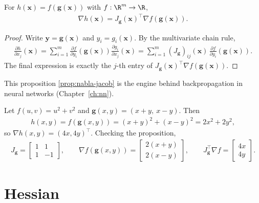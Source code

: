 \documentclass[a4paper, 12pt]{book}
\begin{document}
\begin{proposition}\label{prop:nabla-jacob}
    For $h(\mathbf{x}) = f(\mathbf{g}(\mathbf{x}))$ with $f : \R^m \to \R$,
\begin{align}
    \nabla h(\mathbf{x}) = J_{\mathbf{g}}(\mathbf{x})^\top \nabla f(\mathbf{g}(\mathbf{x})).
\end{align}
\end{proposition}
\begin{proof}
    Write $\mathbf{y}=\mathbf{g}(\mathbf{x})$ and $y_i=g_i(\mathbf{x})$. By the
    multivariate chain rule,
    \begin{align}
        \frac{\partial h}{\partial x_j}(\mathbf{x})
        = \sum_{i=1}^m
          \frac{\partial f}{\partial y_i}(\mathbf{g}(\mathbf{x}))
          \frac{\partial g_i}{\partial x_j}(\mathbf{x})
        = \sum_{i=1}^m
          (J_{\mathbf{g}})_{ij}(\mathbf{x})\,
          \frac{\partial f}{\partial y_i}(\mathbf{g}(\mathbf{x})).
    \end{align}
    The final expression is exactly the $j$-th entry of
    $J_{\mathbf{g}}(\mathbf{x})^\top\nabla f(\mathbf{g}(\mathbf{x}))$.
\end{proof}
This proposition \ref{prop:nabla-jacob} is the engine behind backpropagation in neural networks
(Chapter~\ref{ch:nn}).
\begin{example}
    Let $f(u,v)=u^2+v^2$ and $\mathbf{g}(x,y)=(x+y,\ x-y)$. Then
    \begin{align}
        h(x,y) = f(\mathbf{g}(x,y)) = (x+y)^2+(x-y)^2 = 2x^2+2y^2,
    \end{align}
    so $\nabla h(x,y)=(4x,4y)^\top$. Checking the proposition,
    \begin{align}
        J_{\mathbf{g}} = \begin{bmatrix}1&1\\1&-1\end{bmatrix},
        \qquad
        \nabla f(\mathbf{g}(x,y)) = \begin{bmatrix}2(x+y)\\2(x-y)\end{bmatrix},
        \qquad
        J_{\mathbf{g}}^\top\nabla f = \begin{bmatrix}4x\\4y\end{bmatrix}.
    \end{align}
\end{example}


\section{Hessian}
\end{document}
